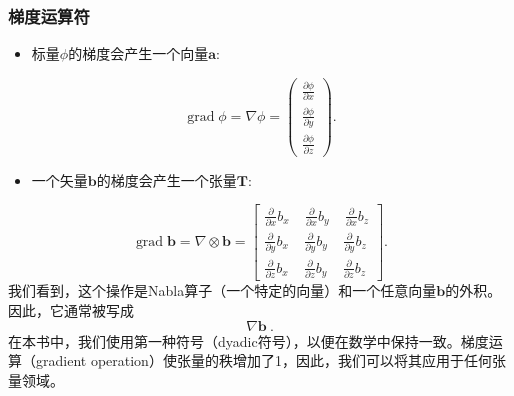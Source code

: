 \documentclass[LBMDerivation.tex]{subfiles}
\begin{document}
\subsubsection{梯度运算符}
%
%
\begin{itemize}
    \item 标量$\phi$的梯度会产生一个向量$\textbf{a}$:
\end{itemize}
%
%
\begin{equation}
 \operatorname{grad}\phi = \nabla \phi
=
  \left(
  \begin{matrix}
    \frac{\partial \phi}{\partial x} \\
    \frac{\partial \phi}{\partial y} \\
    \frac{\partial \phi}{\partial z}
  \end{matrix}
  \right) .
  \label{EQUATION::gradientScalar}
\end{equation}
%
%
\begin{itemize}
    \item 一个矢量$\textbf{b}$的梯度会产生一个张量$\textbf{T}$:
\end{itemize}
%
%
\begin{equation}
 \operatorname{grad}\textbf{b} = \nabla \otimes \textbf{b}
=
  \left[
  \begin{matrix}
   \frac{\partial}{\partial x}b_x ~ ~ ~ ~ ~ \frac{\partial}{\partial x} b_y ~ ~ ~ ~ ~ \frac{\partial}{\partial x} b_z \\
   \frac{\partial}{\partial y}b_x ~ ~ ~ ~ ~ \frac{\partial}{\partial y} b_y ~ ~ ~ ~ ~ \frac{\partial}{\partial y} b_z \\
   \frac{\partial}{\partial z}b_x ~ ~ ~ ~ ~ \frac{\partial}{\partial z} b_y ~ ~ ~ ~ ~ \frac{\partial}{\partial z} b_z
  \end{matrix}
  \right] .
   \label{EQUATION::gradientVector}
\end{equation}
%
%
我们看到，这个操作是Nabla算子（一个特定的向量）和一个任意向量$\textbf{b}$的外积。因此，它通常被写成
%
%
\begin{equation}
  \nabla \textbf{b} ~.
\end{equation}
%
%
    在本书中，我们使用第一种符号（dyadic符号），以便在数学中保持一致。梯度运算（gradient operation）使张量的秩增加了1，因此，我们可以将其应用于任何张量领域。
%
%
%
%
\end{document}
